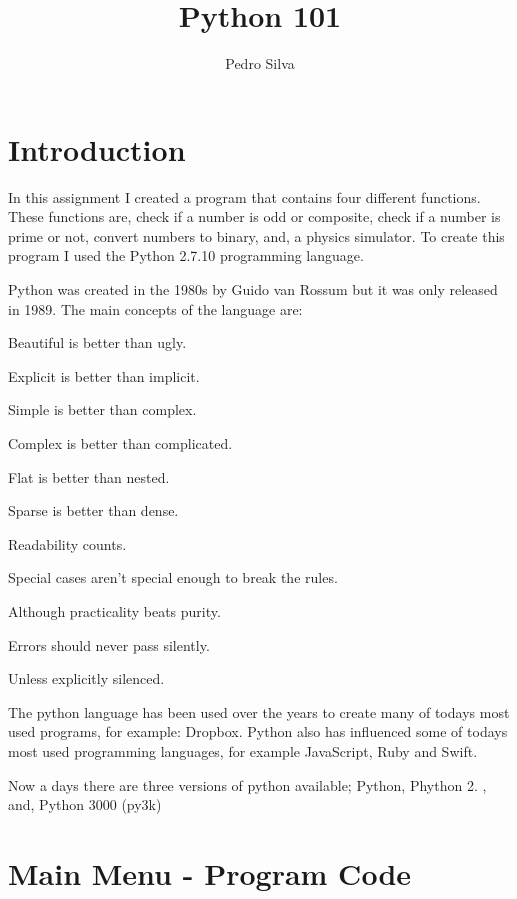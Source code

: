 \documentclass{tufte-handout}
\title{Python 101}
\author[The Academy]{Pedro Silva}
\begin{document}
\maketitle %

\section*{Introduction}

In this assignment I created a program that contains four different functions. These functions are, check if a number is odd or composite, check if a number is prime or not, convert numbers to binary, and, a physics simulator. To create this program I used the Python 2.7.10 programming language.

Python was created in the 1980s by Guido van Rossum but it was only released in 1989. The main concepts of the language are:

Beautiful is better than ugly.

Explicit is better than implicit.

Simple is better than complex.

Complex is better than complicated.

Flat is better than nested.

Sparse is better than dense.

Readability counts.

Special cases aren't special enough to break the rules.

Although practicality beats purity.

Errors should never pass silently.

Unless explicitly silenced.

The python language has been used over the years to create many of todays most used programs, for example: Dropbox. Python also has influenced some of todays most used programming languages, for example JavaScript, Ruby and Swift.



Now a days there are three versions of python available; Python, Phython 2. , and, Python 3000 (py3k)  

\normalsize

\vspace{1cm}

\vspace{1cm}


\newpage
\section{Main Menu - Program Code}
\end{document}
